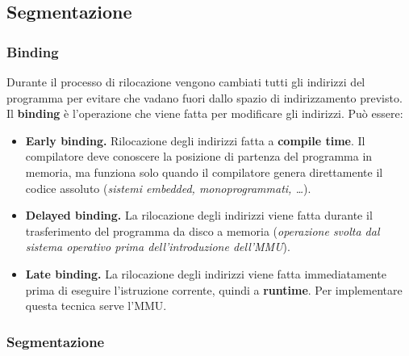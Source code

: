 \documentclass[12pt, twoside, letterpaper]{article}
\begin{document}
		\subsection{Segmentazione}
			
			\subsubsection{Binding}
				
				Durante il processo di rilocazione vengono cambiati tutti gli indirizzi del programma per evitare che vadano fuori dallo spazio di indirizzamento previsto. Il \textbf{binding} è l'operazione che viene fatta per modificare gli indirizzi. Può essere: 
				\begin{itemize}
					\item \textbf{Early binding.} Rilocazione degli indirizzi fatta a \textbf{compile time}. Il compilatore deve conoscere la posizione di partenza del programma in memoria, ma funziona solo quando il compilatore genera direttamente il codice assoluto (\textit{sistemi embedded, monoprogrammati, \dots}).
					\item \textbf{Delayed binding.} La rilocazione degli indirizzi viene fatta durante il trasferimento del programma da disco a memoria (\textit{operazione svolta dal sistema operativo prima dell'introduzione dell'MMU}).
					\item \textbf{Late binding.} La rilocazione degli indirizzi viene fatta immediatamente prima di eseguire l'istruzione corrente, quindi a \textbf{runtime}. Per implementare questa tecnica serve l'MMU. 
				\end{itemize}
				
			\subsubsection{Segmentazione}
				
\end{document}
